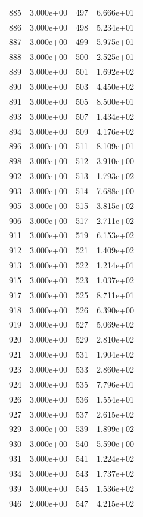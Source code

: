 \documentclass[12pt]{article}
\begin{document}
\begin{longtable}{@{}cccc@{}}
885 & 3.000e+00 & 497 & 6.666e+01 \\
886 & 3.000e+00 & 498 & 5.234e+01 \\
887 & 3.000e+00 & 499 & 5.975e+01 \\
888 & 3.000e+00 & 500 & 2.525e+01 \\
889 & 3.000e+00 & 501 & 1.692e+02 \\
890 & 3.000e+00 & 503 & 4.450e+02 \\
891 & 3.000e+00 & 505 & 8.500e+01 \\
893 & 3.000e+00 & 507 & 1.434e+02 \\
894 & 3.000e+00 & 509 & 4.176e+02 \\
896 & 3.000e+00 & 511 & 8.109e+01 \\
898 & 3.000e+00 & 512 & 3.910e+00 \\
902 & 3.000e+00 & 513 & 1.793e+02 \\
903 & 3.000e+00 & 514 & 7.688e+00 \\
905 & 3.000e+00 & 515 & 3.815e+02 \\
906 & 3.000e+00 & 517 & 2.711e+02 \\
911 & 3.000e+00 & 519 & 6.153e+02 \\
912 & 3.000e+00 & 521 & 1.409e+02 \\
913 & 3.000e+00 & 522 & 1.214e+01 \\
915 & 3.000e+00 & 523 & 1.037e+02 \\
917 & 3.000e+00 & 525 & 8.711e+01 \\
918 & 3.000e+00 & 526 & 6.390e+00 \\
919 & 3.000e+00 & 527 & 5.069e+02 \\
920 & 3.000e+00 & 529 & 2.810e+02 \\
921 & 3.000e+00 & 531 & 1.904e+02 \\
923 & 3.000e+00 & 533 & 2.860e+02 \\
924 & 3.000e+00 & 535 & 7.796e+01 \\
926 & 3.000e+00 & 536 & 1.554e+01 \\
927 & 3.000e+00 & 537 & 2.615e+02 \\
929 & 3.000e+00 & 539 & 1.899e+02 \\
930 & 3.000e+00 & 540 & 5.590e+00 \\
931 & 3.000e+00 & 541 & 1.224e+02 \\
934 & 3.000e+00 & 543 & 1.737e+02 \\
939 & 3.000e+00 & 545 & 1.536e+02 \\
946 & 2.000e+00 & 547 & 4.215e+02 \\

\end{longtable}
\end{document}
